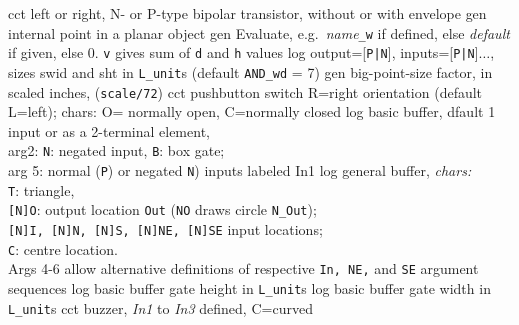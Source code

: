 %
  {cct}%
  {left or right, N- or P-type bipolar transistor, without or with envelope 
    }%
%
  {gen}%
  {internal point in a planar object}%
%
  {gen}%
  {Evaluate, e.g.\ {\sl name}{\tt \_w} if defined, else {\sl default\/}
   if given, else 0. {\tt v} gives sum of {\tt d} and {\tt h} values
     }%
%
  {log}%
  {output=[{\tt P|N}], inputs=[{\tt P|N}]$\ldots$, sizes swid and sht
  in {\tt L\_unit}s (default {\tt AND\_wd} = 7)
    }%
%
  {gen}%
  {big-point-size factor, in scaled inches, ({\tt *scale/72})}%
%
  {cct}%
  {pushbutton switch R=right orientation (default L=left);
     chars: O= normally open, C=normally closed }%
%
  {log}%
  {basic buffer, dfault 1 input or as a 2-terminal element,\\
    arg2: {\tt N}: negated input, {\tt B}: box gate;\\
    arg 5: normal ({\tt P}) or negated {\tt N}) inputs labeled In1 
    }%
%
  {log}%
  {general buffer, {\sl chars:}\\
            {\tt T}: triangle,\\
            {\tt [N]O}: output location {\tt Out}
            ({\tt NO} draws circle {\tt N\_Out});\\
            {\tt [N]I, [N]N, [N]S, [N]NE, [N]SE} input locations;\\
            {\tt C}: centre location.\\
            Args 4-6 allow alternative
            definitions of respective {\tt In, NE,}
            and {\tt SE} argument sequences }%
%
  {log}%
  {basic buffer gate height in {\tt L\_unit}s}%
%
  {log}%
  {basic buffer gate width in {\tt L\_unit}s}%
%
  {cct}%
  {buzzer, {\sl In1} to {\sl In3} defined, C=curved
   }%

